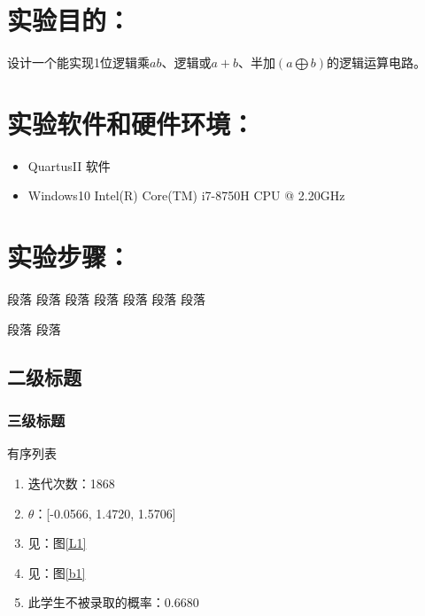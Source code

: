 \documentclass{sdureport}
\begin{document}
\begin{sduDocument}
	\section{实验目的：}
	设计一个能实现1位逻辑乘$ab$、逻辑或$a+b$、半加$(a\bigoplus b)$的逻辑运算电路。

	\section{实验软件和硬件环境：}
	\begin{itemize}[leftmargin=1em]
		\item QuartusII 软件
		\item Windows10 Intel(R) Core(TM) i7-8750H CPU @ 2.20GHz
	\end{itemize}


	\section{实验步骤：}
	段落	段落	段落	段落	段落	段落
	段落



	段落	段落
	\subsection{二级标题}
	\subsubsection{三级标题}

	有序列表
	\begin{enumerate}
		\item 迭代次数：1868
		\item $\theta$：[-0.0566, 1.4720, 1.5706]
		\item 见：图\ref{L1}
		\item 见：图\ref{b1}
		\item 此学生不被录取的概率：0.6680
	\end{enumerate}


\end{sduDocument}
\end{document}
